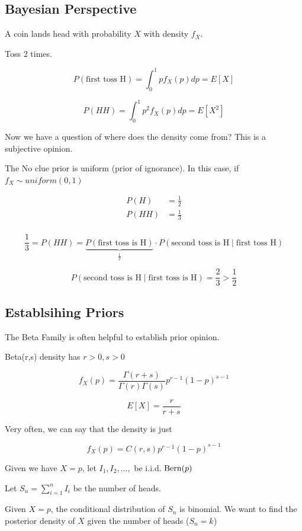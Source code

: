 \documentclass{report}
\begin{document}
\subsection{Bayesian Perspective} 


A coin lands head with probability $ X $ with density $ f_{X} $. 

Toss 2 times. 

\[
P(\text{first toss H}) = \int_{0}^{1}pf_{X}(p)dp = E[X]
\]

\[
P(HH) = \int_{0}^{1} p^{2} f_{X}(p) dp = E[X^{2}]
\]

Now we have a question of where does the density come from? This is a subjective opinion. 

The No clue prior is uniform (prior of ignorance). In this case, if $ f_{X} \sim uniform(0,1) $ 

\begin{align*}
	P(H) &= \frac{1}{2} \\
	P(HH) &=  \frac{1}{3} \\
\end{align*}

\[
	\frac{1}{3} = P(HH) = \underbrace{P(\text{first toss is H})}_{\frac{1}{2}} \cdot P(\text{second toss is H} \mid \text{first toss H})
\]

\[
	P(\text{second toss is H} \mid \text{first toss is H}) = \frac{2}{3} > \frac{1}{2}
\]

\subsection{Establsihing Priors}
The Beta Family is often helpful to establish prior opinion. 

Beta(r,s) density has $ r>0, s>0 $ 


\[
f_{X}(p) = \frac{\Gamma(r+s)}{\Gamma(r)\Gamma(s)} p^{r-1} (1-p)^{s-1}
\]

\[
E[X] = \frac{r}{r+s}
\]

Very often, we can say that the density is just 

\[
f_{X}(p)= C(r,s) p^{r-1} (1-p)^{s-1}
\]

Given we have $ X=p $, let $ I_1, I_2, \dots,  $ be i.i.d. $ \operatorname{Bern}(p)  $ 

Let $ S_{n} = \sum_{i=1}^{n} I_{i} $ be the number of heads. 

Given $ X=p $, the conditional distribution of $ S_{n} $ is binomial. We want to find the posterior density of $ X $ given the number of heads ($ S_{n} = k $)
\end{document}
